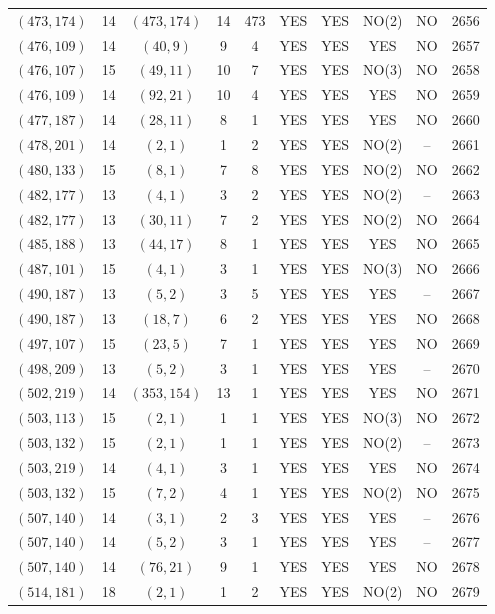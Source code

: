 \begin{longtable}{|c|c|c|c|c|c|c|c|c|c|}
$(473, 174)$ & 14 & $(473, 174)$ & 14 & 473 & YES & YES & NO(2) & NO & 2656\\
$(476, 109)$ & 14 & $(40, 9)$ & 9 & 4 & YES & YES & YES & NO & 2657\\
$(476, 107)$ & 15 & $(49, 11)$ & 10 & 7 & YES & YES & NO(3) & NO & 2658\\
$(476, 109)$ & 14 & $(92, 21)$ & 10 & 4 & YES & YES & YES & NO & 2659\\
$(477, 187)$ & 14 & $(28, 11)$ & 8 & 1 & YES & YES & YES & NO & 2660\\
$(478, 201)$ & 14 & $(2, 1)$ & 1 & 2 & YES & YES & NO(2) & -- & 2661\\
$(480, 133)$ & 15 & $(8, 1)$ & 7 & 8 & YES & YES & NO(2) & NO & 2662\\
$(482, 177)$ & 13 & $(4, 1)$ & 3 & 2 & YES & YES & NO(2) & -- & 2663\\
$(482, 177)$ & 13 & $(30, 11)$ & 7 & 2 & YES & YES & NO(2) & NO & 2664\\
$(485, 188)$ & 13 & $(44, 17)$ & 8 & 1 & YES & YES & YES & NO & 2665\\
$(487, 101)$ & 15 & $(4, 1)$ & 3 & 1 & YES & YES & NO(3) & NO & 2666\\
$(490, 187)$ & 13 & $(5, 2)$ & 3 & 5 & YES & YES & YES & -- & 2667\\
$(490, 187)$ & 13 & $(18, 7)$ & 6 & 2 & YES & YES & YES & NO & 2668\\
$(497, 107)$ & 15 & $(23, 5)$ & 7 & 1 & YES & YES & YES & NO & 2669\\
$(498, 209)$ & 13 & $(5, 2)$ & 3 & 1 & YES & YES & YES & -- & 2670\\
$(502, 219)$ & 14 & $(353, 154)$ & 13 & 1 & YES & YES & YES & NO & 2671\\
$(503, 113)$ & 15 & $(2, 1)$ & 1 & 1 & YES & YES & NO(3) & NO & 2672\\
$(503, 132)$ & 15 & $(2, 1)$ & 1 & 1 & YES & YES & NO(2) & -- & 2673\\
$(503, 219)$ & 14 & $(4, 1)$ & 3 & 1 & YES & YES & YES & NO & 2674\\
$(503, 132)$ & 15 & $(7, 2)$ & 4 & 1 & YES & YES & NO(2) & NO & 2675\\
$(507, 140)$ & 14 & $(3, 1)$ & 2 & 3 & YES & YES & YES & -- & 2676\\
$(507, 140)$ & 14 & $(5, 2)$ & 3 & 1 & YES & YES & YES & -- & 2677\\
$(507, 140)$ & 14 & $(76, 21)$ & 9 & 1 & YES & YES & YES & NO & 2678\\
$(514, 181)$ & 18 & $(2, 1)$ & 1 & 2 & YES & YES & NO(2) & NO & 2679\\

\end{longtable}
